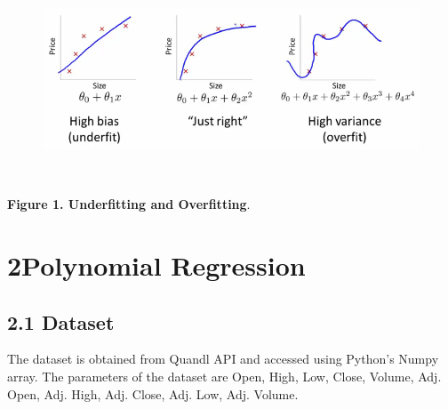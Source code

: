 \documentclass[12pt]{article}
\begin{document}
\vspace{\baselineskip}

\vspace{\baselineskip}

\vspace{\baselineskip}



\begin{figure}[H]
	\begin{Center}
		\includegraphics[width=6.27in,height=2.36in]{./media/image2.png}
	\end{Center}
\end{figure}



\par

\begin{adjustwidth}{0.5in}{0.0in}
\begin{Center}
\textbf{Figure 1. Underfitting and Overfitting}.
\end{Center}\par

\end{adjustwidth}


\vspace{\baselineskip}

\vspace{\baselineskip}
\setlength{\parskip}{12.0pt}
\section*{2\hspace*{10pt}Polynomial Regression}
\subsection*{2.1 Dataset}
The dataset is obtained from Quandl API and accessed using Python’s Numpy array. The parameters of the dataset are Open, High, Low, Close, Volume, Adj. Open, Adj. High, Adj. Close, Adj. Low, Adj. Volume.\par
\end{document}
